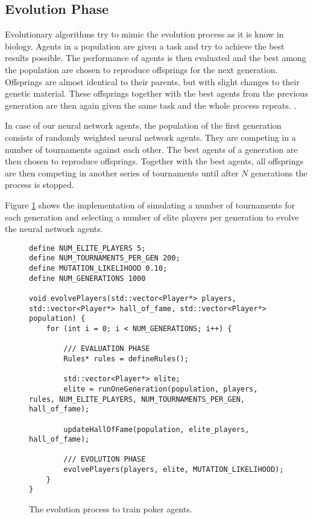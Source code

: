 \subsection{Evolution Phase}
Evolutionary algorithms try to mimic the evolution process as it is know in biology. Agents in a population are given a task and try to achieve the best results possible. The performance of agents is then evaluated and the best among the population are chosen to reproduce offsprings for the next generation. Offsprings are almost identical to their parents, but with slight changes to their genetic material. These offsprings together with the best agents from the previous generation are then again given the same task and the whole process repeats. \cite{evolutionary_methods, nn_evolve}. \par
In case of our neural network agents, the population of the first generation consists of randomly weighted neural network agents. They are competing in a number of tournaments against each other. The best agents of a generation are then chosen to reproduce offsprings. Together with the best agents, all offsprings are then competing in another series of tournaments until after $N$ generations the process is stopped. \par
Figure \ref{fig:evol_code} shows the implementation of simulating a number of tournaments for each generation and selecting a number of elite players per generation to evolve the neural network agents. \par
\pagebreak
\begin{figure}
\begin{lstlisting}
define NUM_ELITE_PLAYERS 5;
define NUM_TOURNAMENTS_PER_GEN 200;
define MUTATION_LIKELIHOOD 0.10;
define NUM_GENERATIONS 1000

void evolvePlayers(std::vector<Player*> players, std::vector<Player*> hall_of_fame, std::vector<Player*> population) {
	for (int i = 0; i < NUM_GENERATIONS; i++) {

        /// EVALUATION PHASE
        Rules* rules = defineRules();

        std::vector<Player*> elite;
        elite = runOneGeneration(population, players, rules, NUM_ELITE_PLAYERS, NUM_TOURNAMENTS_PER_GEN, hall_of_fame);
        
        updateHallOfFame(population, elite_players, hall_of_fame);

        /// EVOLUTION PHASE
        evolvePlayers(players, elite, MUTATION_LIKELIHOOD);
	}
}
\end{lstlisting}
\caption{The evolution process to train poker agents.}
\label{fig:evol_code}
\end{figure}
